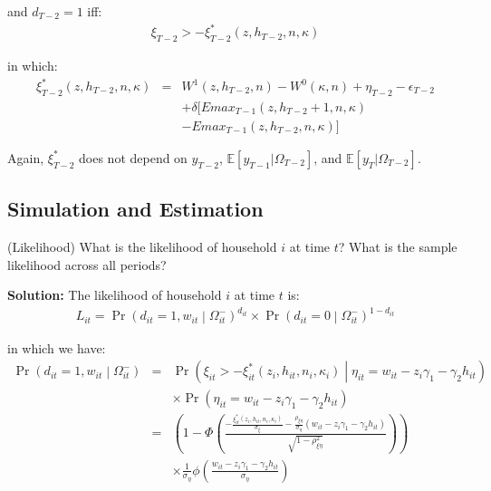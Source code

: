\noindent and $d_{T-2} = 1$ iff:
\begin{eqnarray*}
\xi_{T-2} > -\xi^*_{T-2} \left(z, h_{T-2}, n, \kappa \right)
\end{eqnarray*}

\noindent in which:
\begin{eqnarray*}
\xi^*_{T-2} \left(z, h_{T-2}, n, \kappa \right) &=& W^1\left( z, h_{T-2}, n\right) - W^0\left( \kappa, n\right) + \eta_{T-2} - \epsilon_{T-2}\\
& & + \delta [ Emax_{T-1} \left( z, h_{T-2}+1, n, \kappa \right) \\
& & - Emax_{T-1} \left(z, h_{T-2}, n, \kappa \right)]
\end{eqnarray*}

\noindent Again, $\xi_{T-2}^*$ does not depend on $y_{T-2}$, $\mathbb{E} [y_{T-1} | \Omega_{T-2}]$, and $\mathbb{E} [y_T | \Omega_{T-2}]$.

\subsection{Simulation and Estimation}

\begin{exercise} (Likelihood)
What is the likelihood of household $i$ at time $t$? What is the sample likelihood across all periods?
\end{exercise}

\noindent\textbf{Solution:} The likelihood of household $i$ at time $t$ is:
\begin{eqnarray*}
L_{it} = \Pr \left(d_{it} = 1, w_{it} \middle| \Omega_{it}^- \right)^{d_{it}} \times \Pr \left(d_{it} = 0 \middle| \Omega_{it}^- \right)^{1-d_{it}}
\end{eqnarray*}

\noindent in which we have:
\begin{eqnarray*}
\Pr\left(d_{it}=1, w_{it} \middle| \Omega_{it}^- \right) &=& \Pr \left( \xi_{it} > -\xi_{it}^* \left(z_i, h_{it}, n_i, \kappa_i \right) \middle| \eta_{it} = w_{it} -z_i \gamma_1 - \gamma_2 h_{it} \right)\\
& & \times \Pr \left( \eta_{it} = w_{it} -z_i \gamma_1 - \gamma_2 h_{it} \right)\\
&=& \left( 1 - \Phi \left(\frac{-\frac{\xi_{it}^* \left(z_i, h_{it}, n_i, \kappa_i \right)}{\sigma_\xi} - \frac{\rho_{\xi \eta}}{\sigma_\eta} \left(w_{it} - z_i \gamma_1 - \gamma_2 h_{it} \right)}{\sqrt{1-\rho_{\xi \eta}^2}} \right) \right) \\
& & \times \frac{1}{\sigma_\eta} \phi \left( \frac{w_{it} - z_i \gamma_1 - \gamma_2 h_{it}}{\sigma_\eta} \right) 
\end{eqnarray*}

